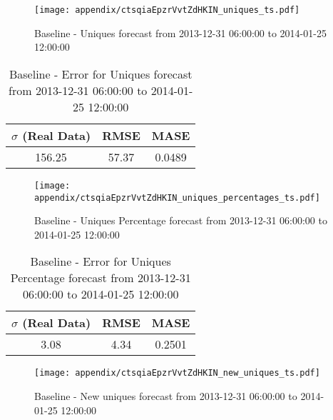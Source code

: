 \begin{figure}[H] \begin{center} \leavevmode
\texttt{[image: appendix/ctsqiaEpzrVvtZdHKIN\_uniques\_ts.pdf]} \caption{
Baseline - Uniques forecast from 2013-12-31 06:00:00 to 2014-01-25 12:00:00} \label{fig:appendix/ctsqiaEpzrVvtZdHKIN_uniques_ts.pdf} \end{center}
\end{figure}

\begin{table}[H]
\centering
\footnotesize
\begin{tabular}{ccc}
$\sigma$ (Real Data) & RMSE & MASE   \\ \hline
156.25 & 57.37 & 0.0489 \\
\end{tabular}

\vspace{0.5cm}

\caption{
Baseline - Error for Uniques forecast from 2013-12-31 06:00:00 to 2014-01-25 12:00:00}
\end{table}

\begin{figure}[H] \begin{center} \leavevmode
\texttt{[image: appendix/ctsqiaEpzrVvtZdHKIN\_uniques\_percentages\_ts.pdf]} \caption{
Baseline - Uniques Percentage forecast from 2013-12-31 06:00:00 to 2014-01-25 12:00:00} \label{fig:appendix/ctsqiaEpzrVvtZdHKIN_uniques_percentages_ts.pdf} \end{center}
\end{figure}

\begin{table}[H]
\centering
\footnotesize
\begin{tabular}{ccc}
$\sigma$ (Real Data) & RMSE & MASE   \\ \hline
3.08 & 4.34 & 0.2501 \\
\end{tabular}

\vspace{0.5cm}

\caption{
Baseline - Error for Uniques Percentage forecast from 2013-12-31 06:00:00 to 2014-01-25 12:00:00}
\end{table}

\begin{figure}[H] \begin{center} \leavevmode
\texttt{[image: appendix/ctsqiaEpzrVvtZdHKIN\_new\_uniques\_ts.pdf]} \caption{
Baseline - New uniques forecast from 2013-12-31 06:00:00 to 2014-01-25 12:00:00} \label{fig:appendix/ctsqiaEpzrVvtZdHKIN_new_uniques_ts.pdf} \end{center}
\end{figure}

